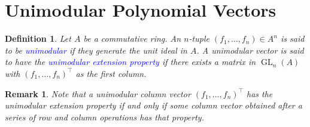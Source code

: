 \documentclass[12pt]{article}
\theoremstyle{thmstyle}
\theoremstyle{defstyle}
\newtheorem{definition}[theorem]{Definition}
\newtheorem{remark}[theorem]{Remark}
\newcommand{\GL}{\operatorname{GL}}
\newcommand{\define}[1]{\textcolor{blue}{\textit{#1}}}
\begin{document}
\section{Unimodular Polynomial Vectors}

\begin{definition}
    Let $A$ be a commutative ring. An $n$-tuple $(f_1,\dots,f_n)\in A^n$ is said to be \define{unimodular} if they generate the unit ideal in $A$. A unimodular vector is said to have the \define{unimodular extension property} if there exists a matrix in $\GL_n(A)$ with $(f_1,\dots, f_n)^\top$ as the first column.
\end{definition}

\begin{remark}
    Note that a unimodular column vector $(f_1,\dots, f_n)^\top$ has the unimodular extension property if and only if some column vector obtained after a series of row and column operations has that property.
\end{remark}
\end{document}
